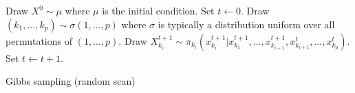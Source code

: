 \begin{algorithm}
\begin{algorithmic}
  \tophrule
  \STATE Draw $X^0\sim\mu$ where $\mu$ is the initial condition.
  \STATE Set $t\leftarrow0$.
  \REPEAT
    \STATE Draw $(k_1,\dots,k_p)\sim\sigma(1,\dots,p)$ where $\sigma$ is
    typically a distribution uniform over all permutations of $(1,\dots,p)$.
      \STATE Draw
      $X_{k_i}^{t+1}\sim
      \pi_{k_i}(x_{k_i}^{t+1}|
      x_{k_1}^{t+1},\dots,x_{k_{i-1}}^{t+1},x_{k_{i+1}}^t,\dots,x_{k_p}^t)$.
    \ENDFOR
    \STATE Set $t\leftarrow t+1$.
  \bottomhrule
\end{algorithmic}
\caption{Gibbs sampling (random scan)}
\label{alg:gibbs random}
\end{algorithm}
